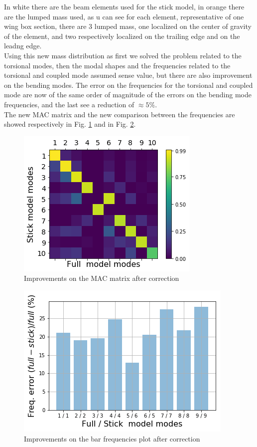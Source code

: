 In white there are the beam elements used for the stick model, in orange there are the lumped mass used, as u can see for each element, representative of one wing box section, there are 3 lumped mass, one localized on the center of gravity of the element, and two respectively localized on the trailing edge and on the leadng edge.\\
Using this new mass distribution as first we solved the problem related to the torsional modes, then the modal shapes and the frequencies related to the torsional and coupled mode assumed sense value, but there are also improvement on the bending modes. The error on the frequencies for the torsional and coupled mode are now of the same order of magnitude of the errors on the bending mode frequencies, and the last see a reduction of $\approx 5\%$.\\
\newpage 
The new MAC matrix and the new comparison between the frequencies are showed respectively in Fig. \ref{fig:4_11} and in Fig. \ref{fig:4_12}.
\begin{figure}[H]
	\centering
	\includegraphics[width = .8\textwidth]{./Immagini/4_15.png}
	\caption{Improvements on the MAC matrix after correction}
	\label{fig:4_11}
\end{figure}
\begin{figure}[H]
	\centering
	\includegraphics[width = .8\textwidth]{./Immagini/4_16.png}
	\caption{Improvements on the bar frequencies plot after correction}
	\label{fig:4_12}
\end{figure}
